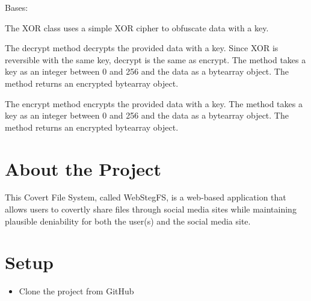 \documentclass[letterpaper,12pt,openany,oneside]{sphinxmanual}
\begin{document}
\begin{fulllineitems}
\label{Encryption:webStegFS.Encryption.xor.XOR}
Bases: 

The XOR class uses a simple XOR cipher to obfuscate data with a key.

\begin{fulllineitems}
\label{Encryption:webStegFS.Encryption.xor.XOR.decrypt}
The decrypt method decrypts the provided data with a key.
Since XOR is reversible with the same key, decrypt is the
same as encrypt.
The method takes a key as an integer between 0 and 256 and
the data as a bytearray object.
The method returns an encrypted bytearray object.

\end{fulllineitems}


\begin{fulllineitems}
\label{Encryption:webStegFS.Encryption.xor.XOR.encrypt}
The encrypt method encrypts the provided data with a key.
The method takes a key as an integer between 0 and 256 and
the data as a bytearray object.
The method returns an encrypted bytearray object.

\end{fulllineitems}


\end{fulllineitems}



\chapter{About the Project}
\label{index:about-the-project}
This Covert File System, called WebStegFS, is a web-based application that allows users to covertly share files through social media sites while maintaining plausible deniability for both the user(s) and the social media site.


\chapter{Setup}
\label{index:setup}\begin{itemize}
\item {} 
Clone the project from GitHub 

\end{itemize}
\end{document}
